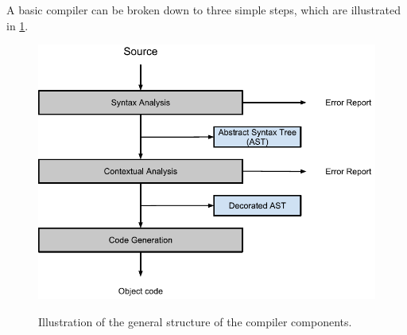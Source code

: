 A basic compiler can be broken down to three simple steps, which are illustrated in \ref{fig:compiler}.

\begin{figure}[H]
\begin{center}
\includegraphics[scale=0.7]{Images/compiler_drawing.png}
\label{fig:compiler}
\caption{Illustration of the general structure of the compiler components.}
\end{center}
\end{figure}